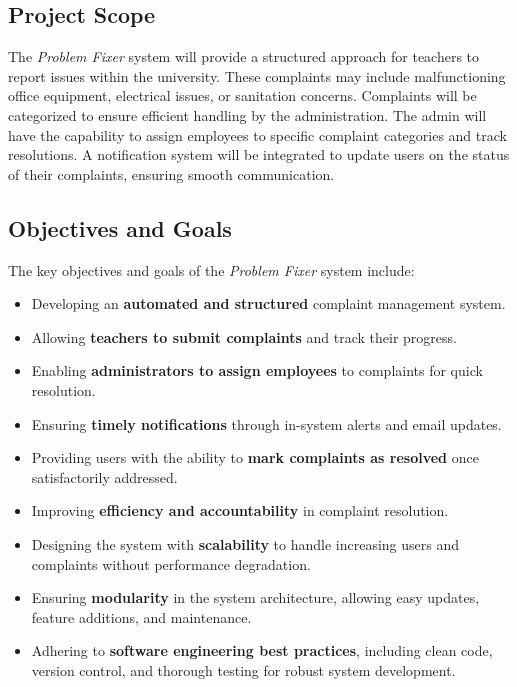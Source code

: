 \documentclass[a4paper,12pt]{article}
\begin{document}
\subsection{Project Scope}

The \textit{Problem Fixer} system will provide a structured approach for teachers to report issues within the university. These complaints may include malfunctioning office equipment, electrical issues, or sanitation concerns. Complaints will be categorized to ensure efficient handling by the administration. The admin will have the capability to assign employees to specific complaint categories and track resolutions. A notification system will be integrated to update users on the status of their complaints, ensuring smooth communication.

\subsection{Objectives and Goals}

The key objectives and goals of the \textit{Problem Fixer} system include:

\begin{itemize}
\item Developing an \textbf{automated and structured} complaint management system.
\item Allowing \textbf{teachers to submit complaints} and track their progress.
\item Enabling \textbf{administrators to assign employees} to complaints for quick resolution.
\item Ensuring \textbf{timely notifications} through in-system alerts and email updates.
\item Providing users with the ability to \textbf{mark complaints as resolved} once satisfactorily addressed.
\item Improving \textbf{efficiency and accountability} in complaint resolution.
\item Designing the system with \textbf{scalability} to handle increasing users and complaints without performance degradation.
\item Ensuring \textbf{modularity} in the system architecture, allowing easy updates, feature additions, and maintenance.
\item Adhering to \textbf{software engineering best practices}, including clean code, version control, and thorough testing for robust system development.
\end{itemize}
\end{document}

